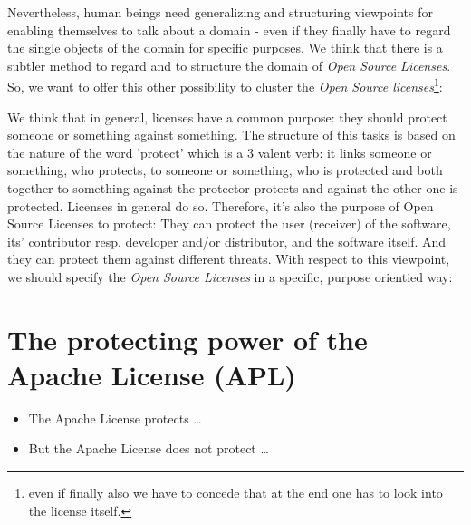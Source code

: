 Nevertheless, human beings need generalizing and structuring viewpoints for
enabling themselves to talk about a domain - even if they finally have to regard
the single objects of the domain for specific purposes. We think that there is
a subtler method to regard and to structure the domain of \emph{Open Source
Licenses}. So, we want to offer this other possibility to cluster the \emph{Open
Source licenses}\footnote{even if finally also we have to concede that at the
end one has to look into the license itself.}:

We think that in general, licenses have a common purpose: they should protect
someone or something against something. The structure of this tasks is based on
the nature of the word 'protect' which is a 3 valent verb: it links someone or
something, who protects, to someone or something, who is protected and both
together to something against the protector protects and against the other one
is protected. Licenses in general do so. Therefore, it's also the purpose of
Open Source Licenses to protect: They can protect the user (receiver) of the
software, its' contributor resp. developer and/or distributor, and the software
itself. And they can protect them against different threats. With respect to
this viewpoint, we should specify the \emph{Open Source Licenses} in a specific,
purpose orientied way:

\section{The protecting power of the Apache License (APL)}
\begin{itemize} 
  \item The Apache License protects \ldots
  \item But the Apache License does not protect \ldots
\end{itemize}

